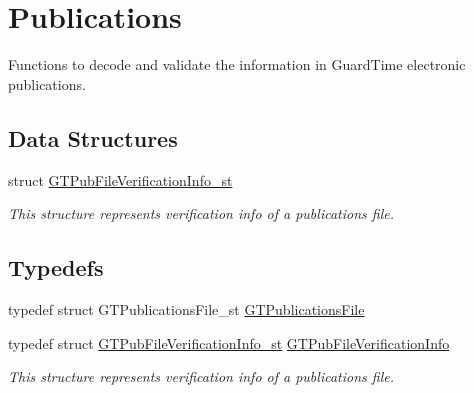 \hypertarget{group__publications}{
\section{Publications}
\label{group__publications}
}


Functions to decode and validate the information in GuardTime electronic publications.  


\subsection*{Data Structures}
\begin{DoxyCompactItemize}
\item 
struct \hyperlink{struct_g_t_pub_file_verification_info__st}{GTPubFileVerificationInfo\_\-st}
\begin{DoxyCompactList}\small\item\em This structure represents verification info of a publications file. \item\end{DoxyCompactList}\end{DoxyCompactItemize}
\subsection*{Typedefs}
\begin{DoxyCompactItemize}
\item 
typedef struct GTPublicationsFile\_\-st \hyperlink{group__publications_gacf561fdbce4067eb94bd9761a71e7e5a}{GTPublicationsFile}
\item 
\hypertarget{group__publications_ga9f0ecc8c6bd1cad3c039c6914c138783}{
typedef struct \hyperlink{struct_g_t_pub_file_verification_info__st}{GTPubFileVerificationInfo\_\-st} \hyperlink{group__publications_ga9f0ecc8c6bd1cad3c039c6914c138783}{GTPubFileVerificationInfo}}
\label{group__publications_ga9f0ecc8c6bd1cad3c039c6914c138783}

\begin{DoxyCompactList}\small\item\em This structure represents verification info of a publications file. \item\end{DoxyCompactList}\end{DoxyCompactItemize}
